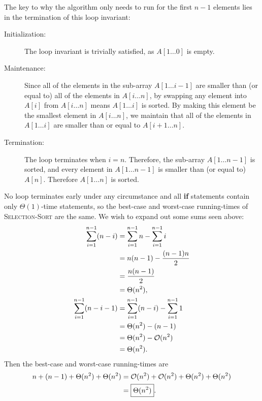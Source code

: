 \documentclass[Chapter02]{subfiles}
\begin{document}
\begin{enumerate}
\begin{answer}
			The key to why the algorithm only needs to run for the first $n - 1$ elements lies in the termination of this loop invariant:
			\begin{description}
				\item[Initialization:] The loop invariant is trivially satisfied, as $A[1 \dots 0]$ is empty.

				\item[Maintenance:] Since all of the elements in the sub-array $A[1 \dots i - 1]$ are smaller than (or equal to) all of the elements in $A[i \dots n]$, by swapping any element into $A[i]$ from $A[i \dots n]$ means $A[1 \dots i]$ is sorted. By making this element be the smallest element in $A[i \dots n]$, we maintain that all of the elements in $A[1 \dots i]$ are smaller than or equal to $A[i + 1 \dots n]$.

				\item[Termination:] The loop terminates when $i = n$. Therefore, the sub-array $A[1 \dots n - 1]$ is sorted, and every element in $A[1 \dots n - 1]$ is smaller than (or equal to) $A[n]$. Therefore $A[1 \dots n]$ is sorted.
			\end{description}

			No loop terminates early under any circumstance and all \textbf{if} statements contain only $\Theta(1)$-time statements, so the best-case and worst-case running-times of \textsc{Selection-Sort} are the same. We wish to expand out some sums seen above:
			\begin{align*}
				\sum_{i = 1}^{n - 1} (n - i) &= \sum_{i = 1}^{n - 1} n - \sum_{i = 1}^{n - 1} i\\
					&= n(n - 1) - \frac{(n-1)n}{2}\\
					&= \frac{n(n-1)}{2}\\
					&= \Theta(n^2),\\
				\sum_{i = 1}^{n - 1} (n - i - 1) &= \sum_{i = 1}^{n - 1} (n - i) - \sum_{i = 1}^{n - 1} 1\\
				    &= \Theta(n^2) - (n - 1)\\
				    &= \Theta(n^2) - \mathcal{O}(n^2)\\
				    &= \Theta(n^2).
			\end{align*}
			Then the best-case and worst-case running-times are
			\begin{align*}
				n + (n - 1) + \Theta(n^2) + \Theta(n^2) &= \mathcal{O}(n^2) + \mathcal{O}(n^2) + \Theta(n^2) + \Theta(n^2)\\
					&= \boxed{\Theta(n^2)}.
			\end{align*}
		\end{answer}


\end{enumerate}
\end{document}
